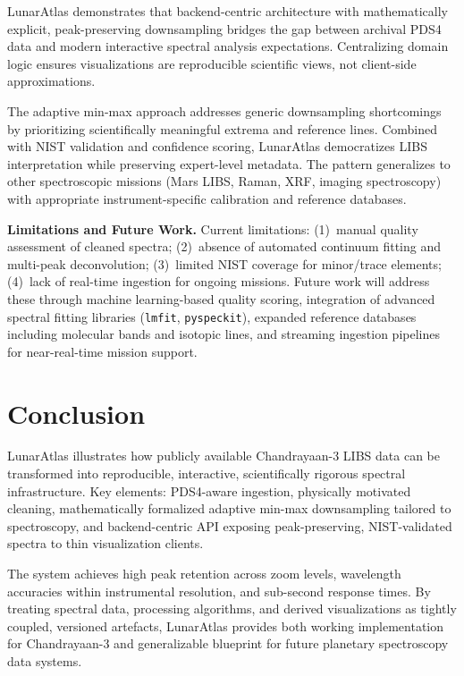 \documentclass[11pt,a4paper]{article}
\begin{document}
LunarAtlas demonstrates that backend-centric architecture with mathematically explicit, peak-preserving downsampling bridges the gap between archival PDS4 data and modern interactive spectral analysis expectations. Centralizing domain logic ensures visualizations are reproducible scientific views, not client-side approximations.

The adaptive min-max approach addresses generic downsampling shortcomings by prioritizing scientifically meaningful extrema and reference lines. Combined with NIST validation and confidence scoring, LunarAtlas democratizes LIBS interpretation while preserving expert-level metadata. The pattern generalizes to other spectroscopic missions (Mars LIBS, Raman, XRF, imaging spectroscopy) with appropriate instrument-specific calibration and reference databases.

\textbf{Limitations and Future Work.} Current limitations: (1)~manual quality assessment of cleaned spectra; (2)~absence of automated continuum fitting and multi-peak deconvolution; (3)~limited NIST coverage for minor/trace elements; (4)~lack of real-time ingestion for ongoing missions. Future work will address these through machine learning-based quality scoring, integration of advanced spectral fitting libraries (\texttt{lmfit}, \texttt{pyspeckit}), expanded reference databases including molecular bands and isotopic lines, and streaming ingestion pipelines for near-real-time mission support.

\section{Conclusion}
\label{sec:conclusion}

LunarAtlas illustrates how publicly available Chandrayaan-3 LIBS data can be transformed into reproducible, interactive, scientifically rigorous spectral infrastructure. Key elements: PDS4-aware ingestion, physically motivated cleaning, mathematically formalized adaptive min-max downsampling tailored to spectroscopy, and backend-centric API exposing peak-preserving, NIST-validated spectra to thin visualization clients.

The system achieves high peak retention across zoom levels, wavelength accuracies within instrumental resolution, and sub-second response times. By treating spectral data, processing algorithms, and derived visualizations as tightly coupled, versioned artefacts, LunarAtlas provides both working implementation for Chandrayaan-3 and generalizable blueprint for future planetary spectroscopy data systems.
\end{document}

